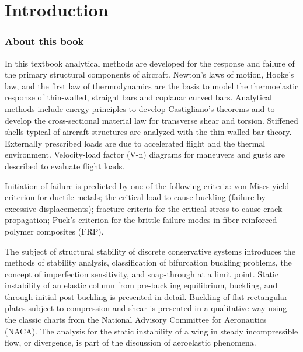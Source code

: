 \documentclass{AeroStructure-ERJohnson}
\begin{document}
\makeatother

\clearemptydoublepage


\chapter*{Introduction}

\subsection*{About this book}
\thispagestyle{fmplain}%
In this textbook analytical methods are developed for the response and
failure of the primary structural components of aircraft. Newton's laws of
motion, Hooke's law, and the first law of thermodynamics are the basis to
model the thermoelastic response of thin-walled, straight bars and coplanar
curved bars. Analytical methods include energy principles to develop
Castigliano's theorems and to develop the cross-sectional material law for
transverse shear and torsion. Stiffened shells typical of aircraft
structures are analyzed with the thin-walled bar theory. Externally
prescribed loads are due to accelerated flight and the thermal environment.
Velocity-load factor (V-n) diagrams for maneuvers and gusts are described to
evaluate flight loads.

\vspace*{12pt}

\noindent Initiation of failure is predicted by one of the following criteria: von
Mises yield criterion for ductile metals; the critical load to cause
buckling (failure by excessive displacements); fracture criteria for the
critical stress to cause crack propagation; Puck's criterion for the brittle
failure modes in fiber-reinforced polymer composites (FRP).
\enlargethispage{1\baselineskip}

\vspace*{12pt}

\noindent The subject of structural stability of discrete conservative systems
introduces the methods of stability analysis, classification of bifurcation
buckling problems, the concept of imperfection sensitivity, and snap-through
at a limit point. Static instability of an elastic column from pre-buckling
equilibrium, buckling, and through initial post-buckling is presented in
detail. Buckling of flat rectangular plates subject to compression and shear
is presented in a qualitative way using the classic charts from the National
Advisory Committee for Aeronautics (NACA). The analysis for the static
instability of a wing in steady incompressible flow, or divergence, is part
of the discussion of aeroelastic phenomena.\vspace*{5pt}
\end{document}
